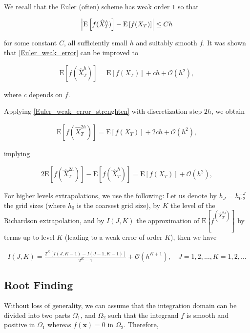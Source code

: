 \documentclass[11pt]{article}
\newcommand{\expt}[1]{\mathrm{E}\left[#1\right]}
\newcommand{\COMMA}{,}
\newcommand{\Ordo}[1]{{\mathcal{O}}\left(#1\right)}
\begin{document}
We  recall that the Euler (often) scheme has weak order $1$ so that

\begin{align}\label{Euler_weak_error}
	\abs{\expt{f(\hat{X}_T^h)}-\expt{f(X_T)} }  \leq C h
\end{align}

for some constant $C$, all sufficiently small $h$ and suitably smooth $f$. It was shown that \ref{Euler_weak_error} can be improved to


\begin{align}\label{Euler_weak_error_strenghten}
	\expt{f(\hat{X}_T^h)}= \expt{f(X_T)} + c h +\Ordo{h^2} \COMMA
\end{align}


where $c$ depends on $f$. 

Applying \ref{Euler_weak_error_strenghten} with discretization step $2h$, we  obtain

\begin{align}\label{Euler_weak_error_strenghten_2h}
	\expt{f(\hat{X}_T^{2h})}= \expt{f(X_T)} + 2 c h +\Ordo{h^2} \COMMA
\end{align}

implying

\begin{align}\label{Richardson_extrapol}
	2 \expt{f(\hat{X}_T^{2h})}- \expt{f(\hat{X}_T^{h})} =\expt{f(X_T)} + \Ordo{h^2} \COMMA
\end{align}

For higher levels extrapolations, we use the following: Let us denote by $h_J=h_0.2^{-J}$ the grid sizes (where $h_0$ is the coarsest grid size), by $K$ the level of the Richardson extrapolation, and by $I(J,K)$ the approximation of $\expt{f^(\hat{X}_T^{h_J})}$ by terms up to level $K$ (leading to a weak error of order $K$), then we have

\begin{align}
	I(J,K)=\frac{2^K\left[I(J,K-1)-I(J-1,K-1)\right]}{2^K-1} +\Ordo{h^{K+1}},\quad J=1,2,\dots, K=1,2,\dots
\end{align}

\subsection{Root Finding}\label{sec: Root Finding}
Without loss of generality, we can assume that the integration domain  can
be divided into two parts $\Omega_1$, and $\Omega_2$ such that the integrand $f$ is smooth and positive in $\Omega_1$
whereas $f(\mathbf{x}) = 0$ in $\Omega_2$. Therefore,
\end{document}
